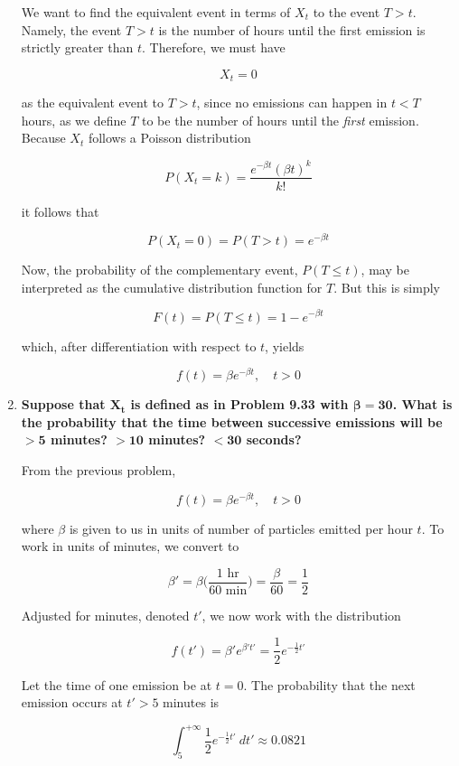 \documentclass[10pt, oneside]{article}   	%
\theoremstyle{definition}
\begin{document}
\begin{enumerate}[label=9.\arabic*]
We want to find the equivalent event in terms of $X_t$ to the event $T > t$. Namely, the event $T > t$ is the number of hours until the first emission is strictly greater than $t$. Therefore, we must have

\[ X_t = 0 \]

as the equivalent event to $T > t$, since no emissions can happen in $t < T$ hours, as we define $T$ to be the number of hours until the \textit{first} emission. Because $X_t$ follows a Poisson distribution

\[ P(X_t = k) = \frac{e^{-\beta t} (\beta t)^k}{k!} \]

it follows that

\[ P(X_t = 0) = P(T > t) = e^{-\beta t} \]

Now, the probability of the complementary event, $P(T \leq t)$, may be interpreted as the cumulative distribution function for $T$. But this is simply

\[ F(t) = P(T \leq t) = 1 - e^{-\beta t} \]

which, after differentiation with respect to $t$, yields

\[ \boxed{f(t) = \beta e^{-\beta t}, \quad t > 0} \]

\item  \begin{tcolorbox}[
  colback=Cerulean!5!white,
  colframe=Cerulean!75!black]
\textbf{Suppose that $\bm{X_t}$ is defined as in Problem 9.33 with $\bm{\beta = 30}$. What is the probability that the time between successive emissions will be $\bm{> 5}$ minutes? $\bm{> 10}$ minutes? $\bm{< 30}$ seconds?}
\end{tcolorbox}

From the previous problem,

\[ f(t) = \beta e^{-\beta t}, \quad t > 0 \]

where $\beta$ is given to us in units of number of particles emitted per hour $t$. To work in units of minutes, we convert to

\[ \beta' = \beta \bigg( \frac{1 \text{ hr}}{60 \text{ min}} \bigg) = \frac{\beta}{60} = \frac{1}{2} \]

Adjusted for minutes, denoted $t'$, we now work with the distribution

\[ f(t') = \beta' e^{\beta' t'} = \frac{1}{2} e^{-\frac{1}{2} t'} \]

Let the time of one emission be at $t = 0$. The probability that the next emission occurs at $t' > 5$ minutes is

\[ \int^{+\infty}_5 \frac{1}{2} e^{-\frac{1}{2} t'} \ dt' \approx \boxed{0.0821} \]


\end{enumerate}
\end{document}
